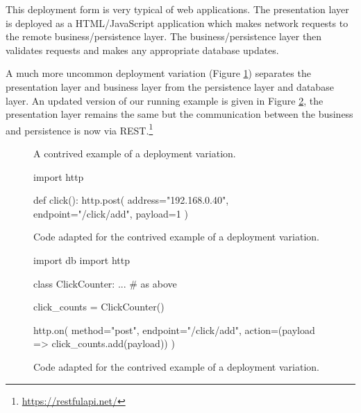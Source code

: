 This deployment form is very typical of web applications.
The presentation layer is deployed as a HTML/JavaScript application which makes network requests to the remote business/persistence layer.
The business/persistence layer then validates requests and makes any appropriate database updates.

A much more uncommon deployment variation (Figure \ref{fig:uncommon-diagram}) separates
the presentation layer and business layer from the persistence layer and database layer.
An updated version of our running example is given in Figure \ref{fig:uncommon-code},
the presentation layer remains the same but the communication between the business and persistence is now via REST.\footnote{\url{https://restfulapi.net/}}

\begin{figure}[ht]
    \centering
    \caption{A contrived example of a deployment variation.}
    \label{fig:uncommon-diagram}
\end{figure}

\begin{figure}[H]
\begin{code}[style=python,title=business.code,captionpos=t]
import http

def click():
    http.post(
        address="192.168.0.40",
        endpoint="/click/add",
        payload=1
    )
\end{code}
\caption{Code adapted for the contrived example of a deployment variation.}
\label{fig:uncommon-code}
\end{figure}

\begin{figure}[H]
\ContinuedFloat
\begin{code}[style=python,title=persistence.code,captionpos=t]
import db
import http

class ClickCounter:
    ... # as above

click_counts = ClickCounter()

http.on(
    method="post",
    endpoint="/click/add",
    action=(payload => click_counts.add(payload))
)
\end{code}
\caption{Code adapted for the contrived example of a deployment variation.}
\end{figure}

